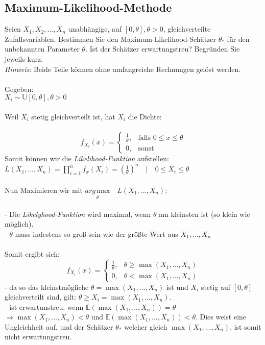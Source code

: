 \documentclass[a4paper]{article}
\begin{document}
\subsection{Maximum-Likelihood-Methode}
Seien $X_1,X_2,\dots,X_n$ unabhängige, auf $[0,\theta], \theta>0$, gleichverteilte Zufallsvariablen. Bestimmen Sie den Maximum-Likelihood-Schätzer $\theta_\ast$ für den unbekannten Parameter $\theta$. Ist der Schätzer erwartungstreu? Begründen Sie jeweils kurz.\\
\textit{Hinweis}: Beide Teile können ohne umfangreiche Rechnungen gelöst werden.\\\\
Gegeben:\\
$X_i \sim \mathbb{U}[0, \theta], \theta > 0$\\\\
Weil $X_i$ stetig gleichverteilt ist, hat $X_i$ die Dichte:\\\\
\[f_{X_i} (x)=\begin{cases}
    \frac{1}{\theta}, & \text{falls } 0 \leq x \leq \theta \\
    0, & \text{sonst}
\end{cases}\]
Somit können wir die \textit{Likelihood-Funktion} aufstellen:\\
$L(X_1, ..., X_n) = \prod\limits_{i = 1}^n f_x(X_i) = \left( \frac{1}{\theta} \right)^n \quad | \quad 0 \leq X_i \leq \theta$\\\\
Nun Maximieren wir mit $\underset{\theta}{arg\,\mathrm{max}}\quad L(X_1, ..., X_n)$:\\\\
- Die \textit{Likelyhood-Funktion} wird maximal, wenn $\theta$ am kleinsten ist (so klein wie möglich).\\
- $\theta$ muss indestens so groß sein wie der größte Wert aus $X_1, ..., X_n$\\\\
Somit ergibt sich:\\
\[f_{X_i} (x)=\begin{cases}
    \frac{1}{\theta}, & \theta \geq \max(X_1, ..., X_n) \\
    0, & \theta < \max(X_1, ..., X_n)
\end{cases}\]
- da so das kleinstmögliche $\theta = \max(X_1, ..., X_n)$ ist und $X_i$ stetig auf $[0, \theta]$ gleichverteilt sind, gilt: $\theta \geq X_i = \max(X_1, ..., X_n)$.\\
- ist erwartunstreu, wenn $\mathbb{E}(\max(X_1, ..., X_n)) = \theta$\\
$\Rightarrow \max(X_1, ..., X_n) < \theta$ und $\mathbb{E}(\max(X_1, ..., X_n)) < \theta$. Dies weist eine Ungleichheit auf, und der Schätzer $\theta_*$ welcher gleich $\max(X_1, ..., X_n)$, ist somit nicht erwartungstreu.
\\\\
\end{document}
